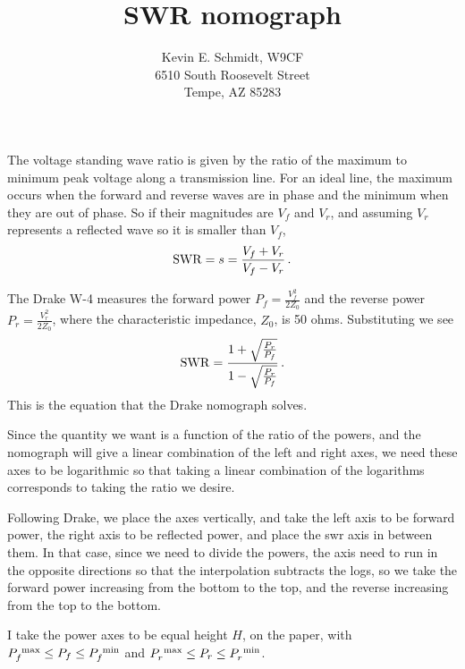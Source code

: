 \documentclass[12pt]{article}
\begin{document}
\let\xxxhat\hat
\let\xxxvec\vec
\renewcommand{\hat}[1]{{\boldsymbol {\xxxhat {#1}} }}
\renewcommand{\vec}[1]{\boldsymbol {#1}}
\newcommand{\dbar}{{ d\hskip -.25em \raisebox{.3em}{-}  }}

\title{SWR nomograph}
\author{Kevin E. Schmidt, W9CF\\
6510 South Roosevelt Street\\
Tempe, AZ 85283\\
}
\maketitle

The voltage standing wave ratio is given by the ratio of the
maximum to minimum peak voltage along a transmission line. For an ideal
line, the maximum occurs when the forward and reverse waves are in
phase and the minimum when they are out of phase. So if their magnitudes
are $V_f$ and $V_r$, and assuming $V_r$ represents a reflected wave
so it is smaller than $V_f$,
\begin{equation}
{\rm SWR} = s = \frac{V_f+V_r}{V_f-V_r} \,.
\end{equation}

The Drake W-4 measures
the forward power $P_f = \frac{V_f^2}{2Z_0}$
and the reverse power $P_r = \frac{V_r^2}{2Z_0}$, where
the characteristic impedance, $Z_0$, is 50 ohms.
Substituting we see
\begin{equation}
\label{eq.swr}
{\rm SWR} =
\frac{1+\sqrt{\frac{P_r}{P_f}}}
{1-\sqrt{\frac{P_r}{P_f}}} \,.
\end{equation}
This is the equation that the Drake nomograph solves.

Since the quantity we want is a function of the ratio of the powers,
and the nomograph will give a linear combination of the left and right
axes, we need these axes to be logarithmic so that taking a linear
combination of the logarithms corresponds to taking the ratio we desire.

Following Drake, we place the axes vertically, and
take the left axis to be forward power, the
right axis to be reflected power, and place the swr axis in between them.
In that case, since we need to divide the powers, the axis need to run
in the opposite directions so that the interpolation subtracts the logs,
so we take the forward power increasing from the bottom to the top,
and the reverse increasing from the top to the bottom.

I take the power axes to be equal height $H$, on the paper, with
$P_f^{~\rm max} \leq P_f \leq P_f^{~\rm min}$
and $P_r^{~\rm max} \leq P_r \leq P_r^{~\rm min}$.
\end{document}
